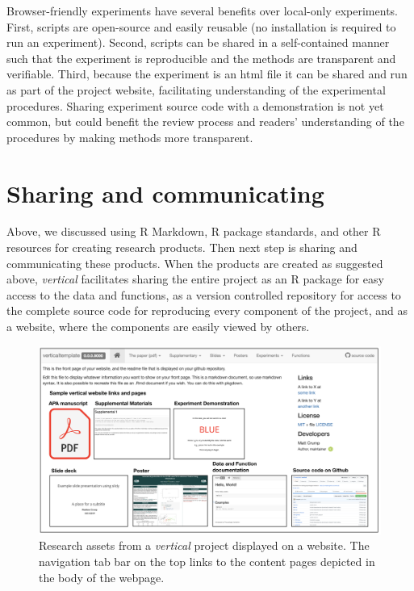 \documentclass[
  english,
  jou,floatsintext]{apa6}
\begin{document}
Browser-friendly experiments have several benefits over local-only experiments. First, scripts are open-source and easily reusable (no installation is required to run an experiment). Second, scripts can be shared in a self-contained manner such that the experiment is reproducible and the methods are transparent and verifiable. Third, because the experiment is an html file it can be shared and run as part of the project website, facilitating understanding of the experimental procedures. Sharing experiment source code with a demonstration is not yet common, but could benefit the review process and readers' understanding of the procedures by making methods more transparent.

\hypertarget{sharing-and-communicating}{%
\section{Sharing and communicating}\label{sharing-and-communicating}}

Above, we discussed using R Markdown, R package standards, and other R resources for creating research products. Then next step is sharing and communicating these products. When the products are created as suggested above, \emph{vertical} facilitates sharing the entire project as an R package for easy access to the data and functions, as a version controlled repository for access to the complete source code for reproducing every component of the project, and as a website, where the components are easily viewed by others.

\begin{figure}

{\centering \includegraphics[width=\textwidth]{images/vertical-website} 

}

\caption{Research assets from a \emph{vertical} project displayed on a website. The navigation tab bar on the top links to the content pages depicted in the body of the webpage.}\label{fig:vertical-project-website}
\end{figure}
\end{document}
